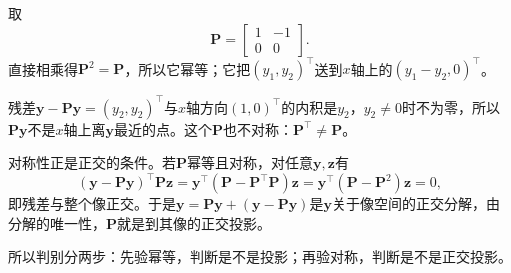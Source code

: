 \begin{example}[反例：幂等而不对称的投影]
\label{ex:ls-oblique-projection}
取
\[
 \bm P=\begin{bmatrix}1&-1\\0&0\end{bmatrix}.
\]
直接相乘得$\bm P^2=\bm P$，所以它幂等；它把$(y_1,y_2)^\top$送到$x$轴上的$(y_1-y_2,0)^\top$。

残差$\bm y-\bm P\bm y=(y_2,y_2)^\top$与$x$轴方向$(1,0)^\top$的内积是$y_2$，$y_2\neq0$时不为零，所以$\bm P\bm y$不是$x$轴上离$\bm y$最近的点。这个$\bm P$也不对称：$\bm P^\top\neq\bm P$。
\end{example}

对称性正是正交的条件。若$\bm P$幂等且对称，对任意$\bm y,\bm z$有
\[
 (\bm y-\bm P\bm y)^\top\bm P\bm z=\bm y^\top(\bm P-\bm P^\top\bm P)\bm z=\bm y^\top(\bm P-\bm P^2)\bm z=0,
\]
即残差与整个像正交。于是$\bm y=\bm P\bm y+(\bm y-\bm P\bm y)$是$\bm y$关于像空间的正交分解，由分解的唯一性，$\bm P$就是到其像的正交投影。

所以判别分两步：先验幂等，判断是不是投影；再验对称，判断是不是正交投影。
